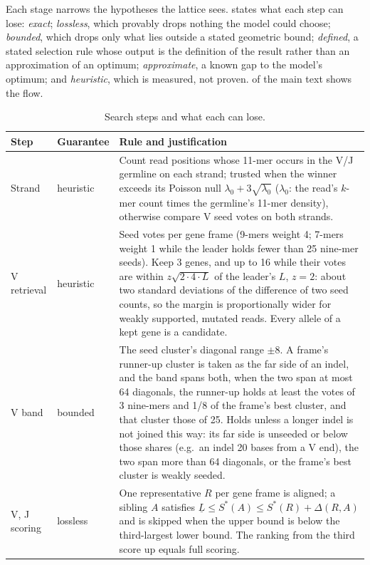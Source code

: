 \documentclass[11pt,a4paper]{article}
\begin{document}
Each stage narrows the hypotheses the lattice sees.  states
what each step can lose: \emph{exact}; \emph{lossless}, which provably drops
nothing the model could choose; \emph{bounded}, which drops only what lies
outside a stated geometric bound; \emph{defined}, a stated selection rule
whose output is the definition of the result rather than an approximation
of an optimum; \emph{approximate}, a known gap to the model's optimum; and
\emph{heuristic}, which is measured, not proven.  of the main text
shows the flow.

\begin{table}[tp]
\centering
\caption{Search steps and what each can lose.}
\label{tab:search}
\footnotesize
\begin{tabularx}{\linewidth}{@{}l l X@{}}
\toprule
Step & Guarantee & Rule and justification \\
\midrule
Strand & heuristic & Count read positions whose 11-mer occurs in the V/J germline on each strand; trusted when the winner exceeds its Poisson null $\lambda_0+3\sqrt{\lambda_0}$ ($\lambda_0$: the read's $k$-mer count times the germline's 11-mer density), otherwise compare V seed votes on both strands. \\
V retrieval & heuristic & Seed votes per gene frame (9-mers weight 4; 7-mers weight 1 while the leader holds fewer than 25 nine-mer seeds). Keep 3 genes, and up to 16 while their votes are within $z\sqrt{2\cdot 4\cdot L}$ of the leader's $L$, $z=2$: about two standard deviations of the difference of two seed counts, so the margin is proportionally wider for weakly supported, mutated reads. Every allele of a kept gene is a candidate. \\
V band & bounded & The seed cluster's diagonal range $\pm 8$. A frame's runner-up cluster is taken as the far side of an indel, and the band spans both, when the two span at most 64 diagonals, the runner-up holds at least the votes of 3 nine-mers and 1/8 of the frame's best cluster, and that cluster those of 25. Holds unless a longer indel is not joined this way: its far side is unseeded or below those shares (e.g.\ an indel 20 bases from a V end), the two span more than 64 diagonals, or the frame's best cluster is weakly seeded. \\
V, J scoring & lossless & One representative $R$ per gene frame is aligned; a sibling $A$ satisfies $\underline{L}\le S^{*}(A)\le S^{*}(R)+\Delta(R,A)$ and is skipped when the upper bound is below the third-largest lower bound. The ranking from the third score up equals full scoring. \\

\end{tabularx}
\end{table}
\end{document}
